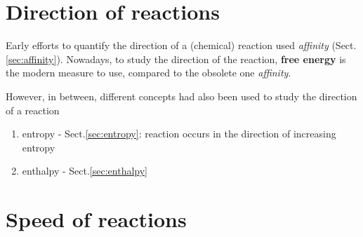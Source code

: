 \section{Direction of reactions}
\label{sec:fact-determ-react}
\label{sec:free-energy-direction-reaction}

Early efforts to quantify the direction of a (chemical) reaction used {\it
affinity} (Sect.\ref{sec:affinity}). Nowadays, to study the direction of the
reaction, {\bf free energy} is the modern measure to use, compared to the
obsolete one {\it affinity}.

However, in between, different concepts had also been used to study the
direction of a reaction
\begin{enumerate}
  \item entropy - Sect.\ref{sec:entropy}: reaction occurs in the direction of
  increasing entropy
  \item enthalpy - Sect.\ref{sec:enthalpy}
\end{enumerate}



\section{Speed of reactions}
\label{sec:speed-reaction}

